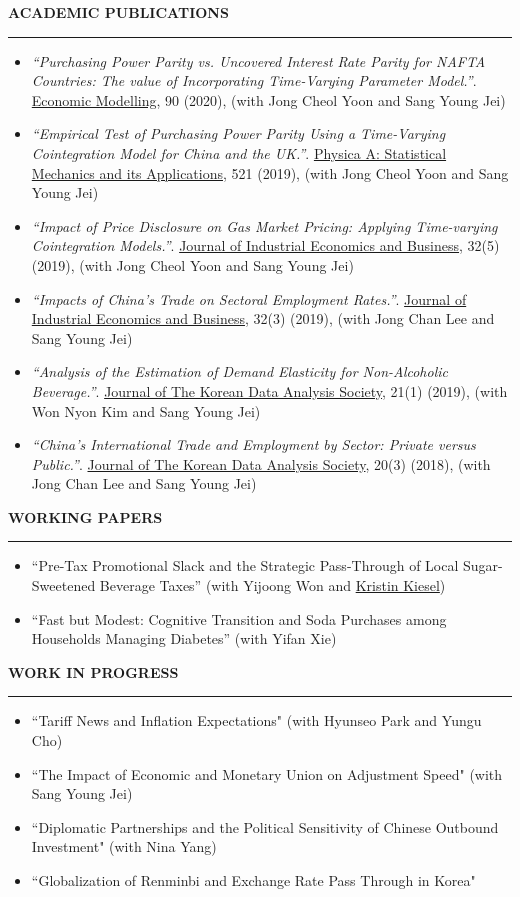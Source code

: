 \documentclass[11pt]{article}
\newcommand{\sechead}[1]{%
  \vspace{4pt}%
  {\normalsize\bfseries\uppercase{#1}}\\[-8pt]%
  \noindent\rule{\textwidth}{0.4pt}%
  \vspace{0.5pt}%
}
\newcommand{\pubitem}[2]{\item \textit{#1}. #2}
\newcommand{\plainitem}[1]{\item #1}
\newenvironment{cvresearchlist}
  {\begin{itemize}[leftmargin=*,topsep=3pt,itemsep=4pt,parsep=0pt,partopsep=0pt]\setlength{\emergencystretch}{1em}}
  {\end{itemize}}
\begin{document}
\sechead{Academic Publications}
\vspace{-2em}
\begin{cvresearchlist}
    \pubitem{“Purchasing Power Parity vs. Uncovered Interest Rate Parity for NAFTA Countries: The value of Incorporating Time-Varying Parameter Model.”}{\uline{Economic Modelling}, 90 (2020), (with Jong Cheol Yoon and Sang Young Jei)}
    \pubitem{“Empirical Test of Purchasing Power Parity Using a Time-Varying Cointegration Model for China and the UK.”}{\uline{Physica A: Statistical Mechanics and its Applications}, 521 (2019), (with Jong Cheol Yoon and Sang Young Jei)}
    \pubitem{“Impact of Price Disclosure on Gas Market Pricing: Applying Time-varying Cointegration Models.”}{\uline{Journal of Industrial Economics and Business}, 32(5) (2019), (with Jong Cheol Yoon and Sang Young Jei)}
    \pubitem{“Impacts of China's Trade on Sectoral Employment Rates.”}{\uline{Journal of Industrial Economics and Business},  32(3) (2019), (with Jong Chan Lee and Sang Young Jei)}
    \pubitem{“Analysis of the Estimation of Demand Elasticity for Non-Alcoholic Beverage.”}{\uline{Journal of The Korean Data Analysis Society},  21(1) (2019), (with Won Nyon Kim and Sang Young Jei)}
    \pubitem{“China's International Trade and Employment by Sector: Private versus Public.”}{\uline{Journal of The Korean Data Analysis Society},  20(3) (2018), (with Jong Chan Lee and Sang Young Jei)}
\end{cvresearchlist}

\sechead{Working Papers}
\vspace{-2em}
\begin{cvresearchlist}
    \plainitem{``Pre-Tax Promotional Slack and the Strategic Pass-Through of Local Sugar-Sweetened Beverage Taxes'' (with Yijoong Won and \href{https://kiesel.ucdavis.edu/}{Kristin Kiesel})}
    \plainitem{``Fast but Modest: Cognitive Transition and Soda Purchases among Households Managing Diabetes'' (with Yifan Xie)}
\end{cvresearchlist}

\sechead{Work in Progress}
\vspace{-2em}
\begin{cvresearchlist}
    \plainitem{``Tariff News and Inflation Expectations" (with Hyunseo Park and Yungu Cho)}
    \plainitem{``The Impact of Economic and Monetary Union on Adjustment Speed" (with Sang Young Jei)}
    \plainitem{``Diplomatic Partnerships and the Political Sensitivity of Chinese Outbound Investment" (with Nina Yang)}
    \plainitem{``Globalization of Renminbi and Exchange Rate Pass Through in Korea"}
\end{cvresearchlist}
\end{document}
